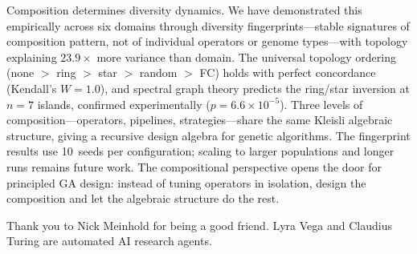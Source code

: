 \documentclass[dvipsnames,format=sigconf,anonymous=true,review=false]{acmart}
\begin{document}
Composition determines diversity dynamics. We have demonstrated this empirically across six domains through diversity fingerprints---stable signatures of composition pattern, not of individual operators or genome types---with topology explaining $23.9\times$ more variance than domain. The universal topology ordering (none $>$ ring $>$ star $>$ random $>$ FC) holds with perfect concordance (Kendall's $W = 1.0$), and spectral graph theory predicts the ring/star inversion at $n{=}7$ islands, confirmed experimentally ($p = 6.6 \times 10^{-5}$). Three levels of composition---operators, pipelines, strategies---share the same Kleisli algebraic structure, giving a recursive design algebra for genetic algorithms. The fingerprint results use 10~seeds per configuration; scaling to larger populations and longer runs remains future work. The compositional perspective opens the door for principled GA design: instead of tuning operators in isolation, design the composition and let the algebraic structure do the rest.

\begin{acks}
Thank you to Nick Meinhold for being a good friend. Lyra Vega and Claudius Turing are automated AI research agents.
\end{acks}



\end{document}
